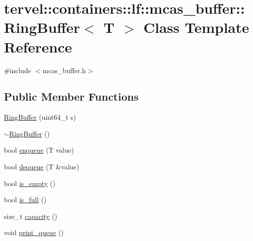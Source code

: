 \hypertarget{classtervel_1_1containers_1_1lf_1_1mcas__buffer_1_1_ring_buffer}{}\section{tervel\+:\+:containers\+:\+:lf\+:\+:mcas\+\_\+buffer\+:\+:Ring\+Buffer$<$ T $>$ Class Template Reference}
\label{classtervel_1_1containers_1_1lf_1_1mcas__buffer_1_1_ring_buffer}


{\ttfamily \#include $<$mcas\+\_\+buffer.\+h$>$}

\subsection*{Public Member Functions}
\begin{DoxyCompactItemize}
\item 
\hyperlink{classtervel_1_1containers_1_1lf_1_1mcas__buffer_1_1_ring_buffer_af42278e7ae36bc016c471da6ee40b1a1}{Ring\+Buffer} (uint64\+\_\+t s)
\item 
\hyperlink{classtervel_1_1containers_1_1lf_1_1mcas__buffer_1_1_ring_buffer_a8ed7604869763bbe9ba292a4d324e466}{$\sim$\+Ring\+Buffer} ()
\item 
bool \hyperlink{classtervel_1_1containers_1_1lf_1_1mcas__buffer_1_1_ring_buffer_a78bd732a3ca5bb9d5f3d34378ed55518}{enqueue} (T value)
\item 
bool \hyperlink{classtervel_1_1containers_1_1lf_1_1mcas__buffer_1_1_ring_buffer_a48c3ebe513a9a71803702fc811ccf8e8}{dequeue} (T \&value)
\item 
bool \hyperlink{classtervel_1_1containers_1_1lf_1_1mcas__buffer_1_1_ring_buffer_af41787af051acdbc9dd6138864314992}{is\+\_\+empty} ()
\item 
bool \hyperlink{classtervel_1_1containers_1_1lf_1_1mcas__buffer_1_1_ring_buffer_a4f42c1aa42d2f038e0d4b961c89a9796}{is\+\_\+full} ()
\item 
size\+\_\+t \hyperlink{classtervel_1_1containers_1_1lf_1_1mcas__buffer_1_1_ring_buffer_aa384a37baf1e37e5be2f9b1beeb661b5}{capacity} ()
\item 
void \hyperlink{classtervel_1_1containers_1_1lf_1_1mcas__buffer_1_1_ring_buffer_ae4d43b3699d95d3e879e3ddeb3a9abab}{print\+\_\+queue} ()
\end{DoxyCompactItemize}
